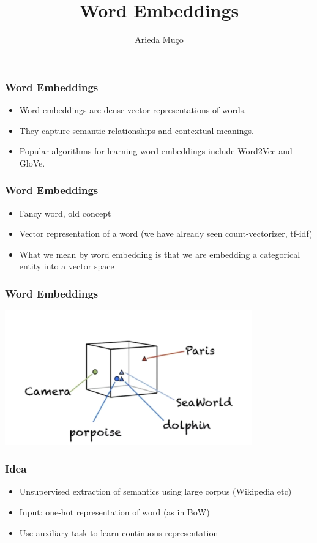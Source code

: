 \documentclass[compress, aspectratio=54]{beamer}
\title[Word Embeddings]{Word Embeddings}
\author[Arieda Mu\c co]{Arieda Mu\c co}
\institute[CEU]{Central European University}
\date{}
\begin{document}
\captionsetup[subfigure]{labelformat=empty}

\frame{\titlepage}



\begin{frame}
\frametitle{Word Embeddings}

\begin{itemize}
  \item Word embeddings are dense vector representations of words.
  \item They capture semantic relationships and contextual meanings.
  \item Popular algorithms for learning word embeddings include Word2Vec and GloVe.
\end{itemize}
\end{frame}

\begin{frame}
\frametitle{Word Embeddings}
\begin{itemize}
\item Fancy word, old concept
\item Vector representation of a word (we have already seen count-vectorizer, tf-idf) 
\item What we mean by word embedding is that we are embedding a categorical entity into a vector space
\end{itemize}
\end{frame}
\begin{frame}
\frametitle{Word Embeddings}
\begin{center}
    \includegraphics[width=0.8\textwidth]{Figures/word-embeddings}
\end{center}
\end{frame}

\begin{frame}
\frametitle{Idea}
\begin{itemize}
\item Unsupervised extraction of semantics using large corpus (Wikipedia etc)
\item Input: one-hot representation of word (as in BoW)
\item Use auxiliary task to learn continuous representation
\end{itemize}
\end{frame}
\end{document}

